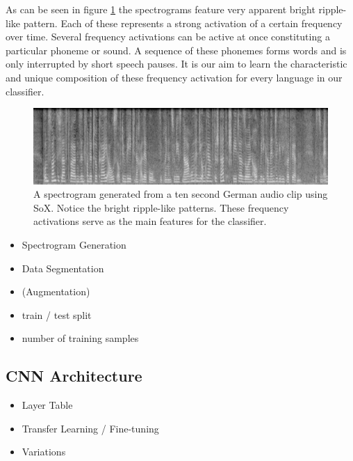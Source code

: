 	As can be seen in figure \ref{fig:spectrogram} the spectrograms feature very apparent bright ripple-like pattern. Each of these represents a strong activation of a certain frequency over time. Several frequency activations can be active at once constituting a particular phoneme or sound. A sequence of these phonemes forms words and is only interrupted by short speech pauses. It is our aim to learn the characteristic and unique composition of these frequency activation for every language in our classifier. 

	
	\begin{figure}[h]
  		\centering
    	\includegraphics[width=\textwidth,keepaspectratio]{img/spectrogram.png}
    	\caption{A spectrogram generated from a ten second German audio clip  using SoX. Notice the bright ripple-like patterns. These frequency activations serve as the main features for the classifier.}
    	\label{fig:spectrogram}
	\end{figure}
	
    \begin{itemize}
        \item Spectrogram Generation
        \item Data Segmentation
        \item (Augmentation)
        \item train / test split
		\item number of training samples
    \end{itemize}

\subsection{CNN Architecture}


    \begin{itemize}
        \item Layer Table
        \item Transfer Learning / Fine-tuning
        \item Variations
    \end{itemize}
    
